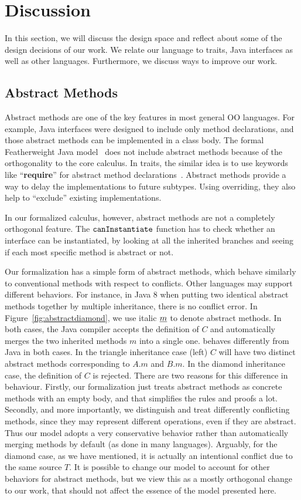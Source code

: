 \section{Discussion}\label{sec:discussion}
In this section, we will discuss the design space and reflect about some of the design decisions of our work. We relate 
our language to traits, Java interfaces as well as other languages. Furthermore, we discuss
ways to improve our work.

\subsection{Abstract Methods}

Abstract methods are one of the key features in most general OO languages. For example, Java interfaces were designed
to include only method declarations, and those abstract methods can be implemented in a class body. 
The formal Featherweight Java model~\cite{Igarashi01FJ} does not include abstract methods because of the orthogonality
to the core calculus. In traits, the
similar idea is to use keywords like ``\textbf{require}'' for abstract method declarations~\cite{scharli03traits}.
Abstract methods provide a way to
delay the implementations to future subtypes. Using overriding, they also help to ``exclude'' existing implementations.

In our formalized calculus, however, abstract methods are not a completely orthogonal feature. The $\texttt{canInstantiate}$ function
has to check whether an interface can be instantiated, by looking at all the inherited branches and seeing if each most specific method
is abstract or not.

Our formalization has a simple form of abstract methods, which behave similarly to conventional methods with respect to conflicts.
Other languages may support different behaviors.
For instance, in Java 8 when putting two identical abstract methods together by multiple inheritance, there is no conflict error. In Figure~\ref{fig:abstractdiamond}, we use italic $\emph{m}$ to denote abstract methods. In both cases, the Java compiler accepts the definition of $C$ and automatically merges the two inherited methods $m$ into a single one. \MIM{} behaves differently from Java in both cases.
In the triangle inheritance case (left) $C$ will have two distinct abstract methods corresponding to $A.m$ and $B.m$. 
In the diamond inheritance case, the definition of $C$ is rejected. 
There are two reasons for this difference in behaviour. Firstly, our formalization just treats abstract methods as concrete methods with an empty body, and that simplifies
the rules and proofs a lot. Secondly, and more importantly, we distinguish and treat differently conflicting methods, since they may represent different operations, even if they are abstract. Thus our model adopts a very conservative behavior rather than automatically merging 
methods by default (as done in many languages). 
Arguably, for the diamond case, as we have mentioned, it is actually an intentional conflict due to the same source $T$.
It is possible to change our model to account for other behaviors for abstract methods, but we view this as a mostly 
orthogonal change to our work, that should not affect the essence of the model presented here.

